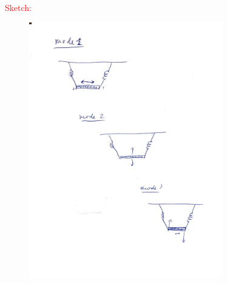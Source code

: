 \documentclass{article}
\theoremstyle{definition}
\begin{document}
\begin{enumerate}[label=(\alph*)]
	\textcolor{red}{Sketch:}
	\begin{figure}[!htb]
		\centering
		\includegraphics[width=0.75\textwidth]{modes5}
	\end{figure}
	
\end{enumerate}

	
\end{document}

